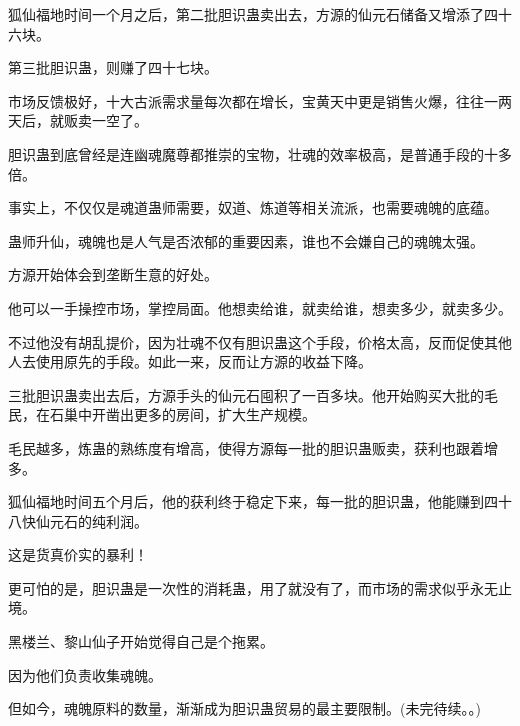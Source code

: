 \begin{this_body}
狐仙福地时间一个月之后，第二批胆识蛊卖出去，方源的仙元石储备又增添了四十六块。

第三批胆识蛊，则赚了四十七块。

市场反馈极好，十大古派需求量每次都在增长，宝黄天中更是销售火爆，往往一两天后，就贩卖一空了。

胆识蛊到底曾经是连幽魂魔尊都推崇的宝物，壮魂的效率极高，是普通手段的十多倍。

事实上，不仅仅是魂道蛊师需要，奴道、炼道等相关流派，也需要魂魄的底蕴。

蛊师升仙，魂魄也是人气是否浓郁的重要因素，谁也不会嫌自己的魂魄太强。

方源开始体会到垄断生意的好处。

他可以一手操控市场，掌控局面。他想卖给谁，就卖给谁，想卖多少，就卖多少。

不过他没有胡乱提价，因为壮魂不仅有胆识蛊这个手段，价格太高，反而促使其他人去使用原先的手段。如此一来，反而让方源的收益下降。

三批胆识蛊卖出去后，方源手头的仙元石囤积了一百多块。他开始购买大批的毛民，在石巢中开凿出更多的房间，扩大生产规模。

毛民越多，炼蛊的熟练度有增高，使得方源每一批的胆识蛊贩卖，获利也跟着增多。

狐仙福地时间五个月后，他的获利终于稳定下来，每一批的胆识蛊，他能赚到四十八快仙元石的纯利润。

这是货真价实的暴利！

更可怕的是，胆识蛊是一次性的消耗蛊，用了就没有了，而市场的需求似乎永无止境。

黑楼兰、黎山仙子开始觉得自己是个拖累。

因为他们负责收集魂魄。

但如今，魂魄原料的数量，渐渐成为胆识蛊贸易的最主要限制。(未完待续。。)

\end{this_body}

